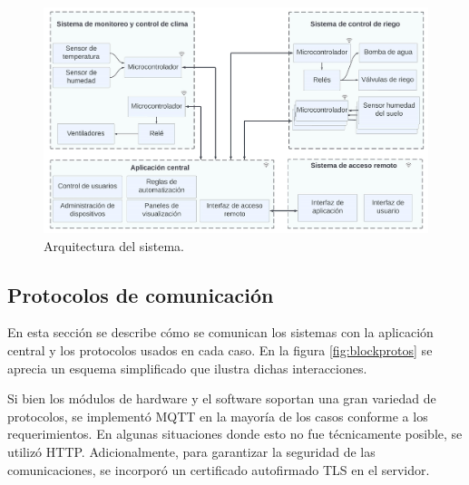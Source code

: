 \begin{figure}[h]
	\centering
	\includegraphics[width=1.0\textwidth]{./Figures/blockdiagram4.jpg}
	\caption[Arquitectura del sistema.]{Arquitectura del sistema.}
	\label{fig:blockdiagram}

\end{figure}


\subsection{Protocolos de comunicación}
\label{Protocolos de comunicación}


En esta sección se describe cómo se comunican los sistemas con la aplicación central y los protocolos usados en cada caso. En la figura \ref{fig:blockprotos} se aprecia un esquema simplificado que ilustra dichas interacciones.

Si bien los módulos de hardware y el software soportan una gran variedad de protocolos,  se implementó MQTT en la mayoría de los casos conforme a los requerimientos. En algunas situaciones donde esto no fue técnicamente posible, se utilizó HTTP. Adicionalmente, para garantizar la seguridad de las comunicaciones, se incorporó un certificado autofirmado TLS en el servidor.

